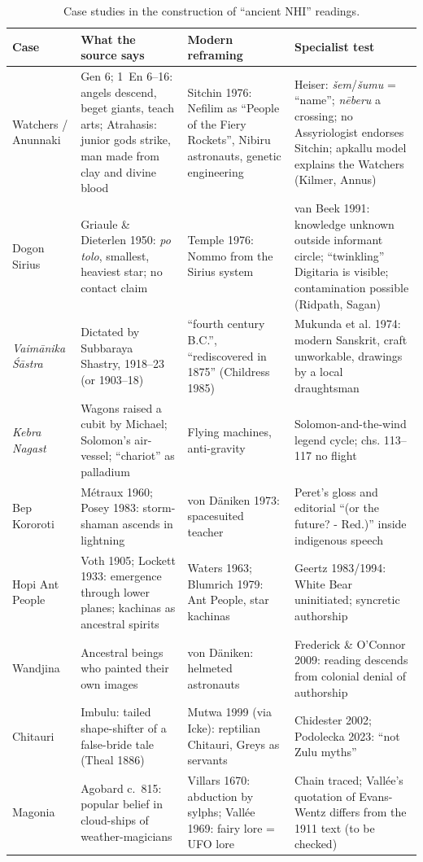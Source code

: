 \documentclass[11pt,a4paper]{article}
\begin{document}
\begin{table}[ht]
\centering\footnotesize
\caption{Case studies in the construction of ``ancient NHI'' readings.}\label{tab:cases}
\begin{tabularx}{\textwidth}{@{}p{2.3cm}XXX@{}}
\toprule
Case & What the source says & Modern reframing & Specialist test \\
\midrule
Watchers / Anunnaki & Gen 6; 1~En 6--16: angels descend, beget giants, teach arts; Atrahasis: junior gods strike, man made from clay and divine blood & Sitchin 1976: Nefilim as ``People of the Fiery Rockets'', Nibiru astronauts, genetic engineering & Heiser: \emph{šem}/\emph{šumu} = ``name''; \emph{nēberu} a crossing; no Assyriologist endorses Sitchin; apkallu model explains the Watchers (Kilmer, Annus) \\
Dogon Sirius & Griaule \& Dieterlen 1950: \emph{po tolo}, smallest, heaviest star; no contact claim & Temple 1976: Nommo from the Sirius system & van Beek 1991: knowledge unknown outside informant circle; ``twinkling'' Digitaria is visible; contamination possible (Ridpath, Sagan) \\
\emph{Vaimānika Śāstra} & Dictated by Subbaraya Shastry, 1918--23 (or 1903--18) & ``fourth century B.C.'', ``rediscovered in 1875'' (Childress 1985) & Mukunda et al. 1974: modern Sanskrit, craft unworkable, drawings by a local draughtsman \\
\emph{Kebra Nagast} & Wagons raised a cubit by Michael; Solomon's air-vessel; ``chariot'' as palladium & Flying machines, anti-gravity & Solomon-and-the-wind legend cycle; chs. 113--117 no flight \\
Bep Kororoti & Métraux 1960; Posey 1983: storm-shaman ascends in lightning & von Däniken 1973: spacesuited teacher & Peret's gloss and editorial ``(or the future? - Red.)'' inside indigenous speech \\
Hopi Ant People & Voth 1905; Lockett 1933: emergence through lower planes; kachinas as ancestral spirits & Waters 1963; Blumrich 1979: Ant People, star kachinas & Geertz 1983/1994: White Bear uninitiated; syncretic authorship \\
Wandjina & Ancestral beings who painted their own images & von Däniken: helmeted astronauts & Frederick \& O'Connor 2009: reading descends from colonial denial of authorship \\
Chitauri & Imbulu: tailed shape-shifter of a false-bride tale (Theal 1886) & Mutwa 1999 (via Icke): reptilian Chitauri, Greys as servants & Chidester 2002; Podolecka 2023: ``not Zulu myths'' \\
Magonia & Agobard c.~815: popular belief in cloud-ships of weather-magicians & Villars 1670: abduction by sylphs; Vallée 1969: fairy lore = UFO lore & Chain traced; Vallée's quotation of Evans-Wentz differs from the 1911 text (to be checked) \\
\bottomrule
\end{tabularx}
\end{table}
\end{document}
